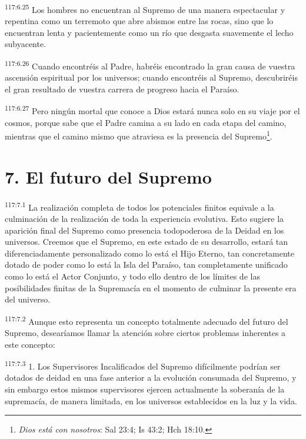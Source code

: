\documentclass[twoside, 11pt]{book}
\begin{document}
\par
\textsuperscript{117:6.25} Los hombres no encuentran al Supremo de una manera espectacular y repentina como un terremoto que abre abismos entre las rocas, sino que lo encuentran lenta y pacientemente como un río que desgasta suavemente el lecho subyacente.

\par
\textsuperscript{117:6.26} Cuando encontréis al Padre, habréis encontrado la gran causa de vuestra ascensión espiritual por los universos; cuando encontréis al Supremo, descubriréis el gran resultado de vuestra carrera de progreso hacia el Paraíso.

\par
\textsuperscript{117:6.27} Pero ningún mortal que conoce a Dios estará nunca solo en su viaje por el cosmos, porque sabe que el Padre camina a su lado en cada etapa del camino, mientras que el camino mismo que atraviesa es la presencia del Supremo\footnote{\textit{Dios está con nosotros}: Sal 23:4; Is 43:2; Hch 18:10.}.

\section*{7. El futuro del Supremo}
\par
\textsuperscript{117:7.1} La realización completa de todos los potenciales finitos equivale a la culminación de la realización de toda la experiencia evolutiva. Esto sugiere la aparición final del Supremo como presencia todopoderosa de la Deidad en los universos. Creemos que el Supremo, en este estado de su desarrollo, estará tan diferenciadamente personalizado como lo está el Hijo Eterno, tan concretamente dotado de poder como lo está la Isla del Paraíso, tan completamente unificado como lo está el Actor Conjunto, y todo ello dentro de los límites de las posibilidades finitas de la Supremacía en el momento de culminar la presente era del universo.

\par
\textsuperscript{117:7.2} Aunque esto representa un concepto totalmente adecuado del futuro del Supremo, desearíamos llamar la atención sobre ciertos problemas inherentes a este concepto:

\par
\textsuperscript{117:7.3} 1. Los Supervisores Incalificados del Supremo difícilmente podrían ser dotados de deidad en una fase anterior a la evolución consumada del Supremo, y sin embargo estos mismos supervisores ejercen actualmente la soberanía de la supremacía, de manera limitada, en los universos establecidos en la luz y la vida.
\end{document}
